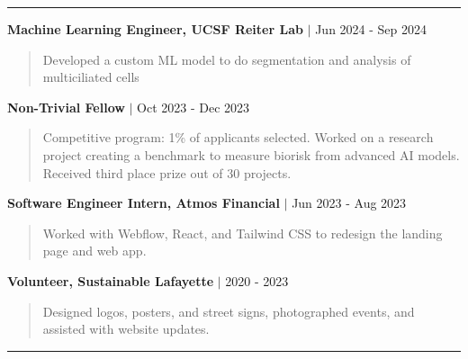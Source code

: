 \documentclass[12pt, letterpaper]{article}
\begin{document}
\noindent\rule{7.5in}{0.5pt}

\quad

\vspace{-2.5px}
\vspace{-2.5px}

\quad

\noindent \textbf{Machine Learning Engineer, UCSF Reiter Lab} $\vert$ Jun 2024 - Sep 2024
\quad
\begin{quotation}
    \noindent Developed a custom ML model to do segmentation and analysis of multiciliated cells
\end{quotation}

\noindent \textbf{Non-Trivial Fellow} $\vert$ Oct 2023 - Dec 2023
\quad
\begin{quotation}
    \noindent Competitive program: 1\% of applicants selected. Worked on a research project creating a benchmark to measure biorisk from advanced AI models. Received third place prize out of 30 projects.
\end{quotation}

\noindent \textbf{Software Engineer Intern, Atmos Financial} $\vert$ Jun 2023 - Aug 2023
\begin{quotation}
    \noindent Worked with Webflow, React, and Tailwind CSS to redesign the landing page and web app.
\end{quotation}

\noindent \textbf{Volunteer, Sustainable Lafayette} $\vert$ 2020 - 2023
\begin{quotation}
    \noindent Designed logos, posters, and street signs, photographed events, and assisted with website updates.
\end{quotation}

\noindent\rule{7.5in}{0.5pt}

\quad

\vspace{-2.5px}
\vspace{-2.5px}

\quad
\end{document}
